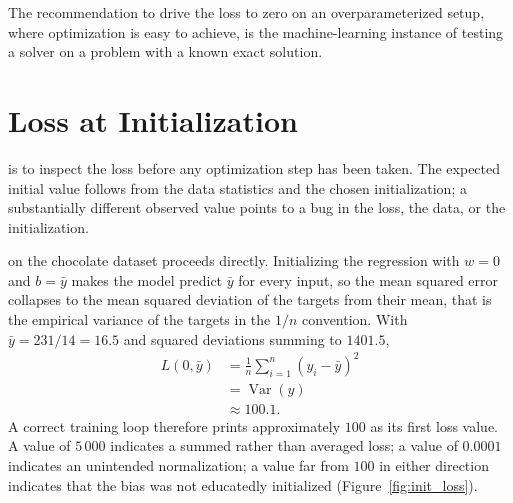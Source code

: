 The recommendation to drive the loss to zero on an overparameterized setup, where optimization is easy to achieve,
is the machine-learning instance of testing a solver on a problem with a known exact solution.

\vfill
{}









\newpage
\section{Loss at Initialization}


 is to inspect the loss before any optimization step has been taken.
The expected initial value follows from the data statistics and the chosen initialization;
a substantially different observed value points to a bug in the loss, the data, or the initialization.


 on the chocolate dataset proceeds directly.
Initializing the regression with $w = 0$ and $b = \bar{y}$ makes the model predict $\bar{y}$ for every input,
so the mean squared error collapses to the mean squared deviation of the targets from their mean,
that is the empirical variance of the targets in the $1/n$ convention.
With $\bar{y} = 231/14 = 16.5$ and squared deviations summing to $1401.5$,
\begin{align*}
    L(0, \bar{y}) &= \frac{1}{n} \sum_{i=1}^{n} (y_i - \bar{y})^2 \\
                  &= \operatorname{Var}(y) \\
                  &\approx 100.1.
\end{align*}
A correct training loop therefore prints approximately $100$ as its first loss value.
A value of $5\,000$ indicates a summed rather than averaged loss;
a value of $0.0001$ indicates an unintended normalization;
a value far from $100$ in either direction indicates that the bias was not educatedly initialized (Figure~\ref{fig:init_loss}).


